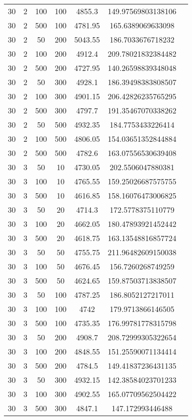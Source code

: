 {\begin{longtabu}{S
S
S
S
S
S[round-mode=places, round-precision=0]
S[round-mode=places, round-precision=0]}
30 & 2 & 100 & 100 & 4855.3 & 149.97569803138106 \\
30 & 2 & 500 & 100 & 4781.95 & 165.6389069633098 \\
30 & 2 & 50 & 200 & 5043.55 & 186.7033676718232 \\
30 & 2 & 100 & 200 & 4912.4 & 209.78021832384482 \\
30 & 2 & 500 & 200 & 4727.95 & 140.26598839348048 \\
30 & 2 & 50 & 300 & 4928.1 & 186.39498383808507 \\
30 & 2 & 100 & 300 & 4901.15 & 206.42826235765295 \\
30 & 2 & 500 & 300 & 4797.7 & 191.35467070338262 \\
30 & 2 & 50 & 500 & 4932.35 & 184.7753433226414 \\
30 & 2 & 100 & 500 & 4806.05 & 154.03651352844884 \\
30 & 2 & 500 & 500 & 4782.6 & 163.07556530639408 \\
30 & 3 & 50 & 10 & 4730.05 & 202.5506047880381 \\
30 & 3 & 100 & 10 & 4765.55 & 159.25026687575755 \\
30 & 3 & 500 & 10 & 4616.85 & 158.16076473006825 \\
30 & 3 & 50 & 20 & 4714.3 & 172.5778375110779 \\
30 & 3 & 100 & 20 & 4662.05 & 180.47893921452442 \\
30 & 3 & 500 & 20 & 4618.75 & 163.13548816857724 \\
30 & 3 & 50 & 50 & 4755.75 & 211.96482609150038 \\
30 & 3 & 100 & 50 & 4676.45 & 156.7260268749259 \\
30 & 3 & 500 & 50 & 4624.65 & 159.87503713838507 \\
30 & 3 & 50 & 100 & 4787.25 & 186.8052127217011 \\
30 & 3 & 100 & 100 & 4742 & 179.9713866146505 \\
30 & 3 & 500 & 100 & 4735.35 & 176.99781778315798 \\
30 & 3 & 50 & 200 & 4908.7 & 208.72999305322654 \\
30 & 3 & 100 & 200 & 4848.55 & 151.25590071134414 \\
30 & 3 & 500 & 200 & 4784.5 & 149.41837236431135 \\
30 & 3 & 50 & 300 & 4932.15 & 142.38584023701233 \\
30 & 3 & 100 & 300 & 4902.55 & 165.07709562504422 \\
30 & 3 & 500 & 300 & 4847.1 & 147.172993446488 \\

\end{longtabu}}
